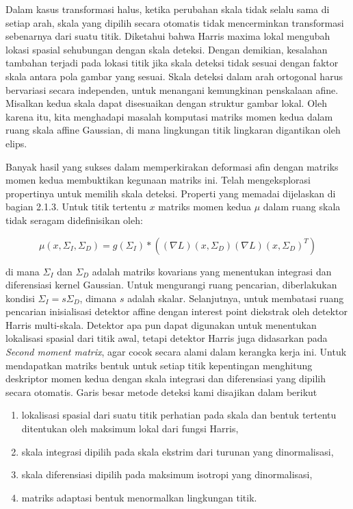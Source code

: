Dalam kasus transformasi halus, ketika perubahan skala tidak selalu sama di setiap arah, skala yang dipilih secara otomatis tidak mencerminkan transformasi sebenarnya dari suatu titik. Diketahui bahwa Harris maxima lokal mengubah lokasi spasial sehubungan dengan skala deteksi. Dengan demikian, kesalahan tambahan terjadi pada lokasi titik jika skala deteksi tidak sesuai dengan faktor skala antara pola gambar yang sesuai. Skala deteksi dalam arah ortogonal harus bervariasi secara independen, untuk menangani kemungkinan penskalaan afine. Misalkan kedua skala dapat disesuaikan dengan struktur gambar lokal. Oleh karena itu, kita menghadapi masalah komputasi matriks momen kedua dalam ruang skala affine Gaussian, di mana lingkungan titik lingkaran digantikan oleh elips.

Banyak hasil yang sukses dalam memperkirakan deformasi afin dengan matriks momen kedua membuktikan kegunaan matriks ini. Telah mengeksplorasi propertinya untuk memilih skala deteksi. Properti yang memadai dijelaskan di bagian 2.1.3. Untuk titik tertentu \(x\) matriks momen kedua \(\mu \) dalam ruang skala tidak seragam didefinisikan oleh:

\begin{equation*}
  \mu(x,\Sigma_{I},\Sigma_{D}) = g(\Sigma_{I}) * ((\nabla L)(x,\Sigma_{D})(\nabla L)(x,\Sigma_{D})^{T})
\end{equation*}

di mana \(\Sigma_{I}\) dan \(\Sigma_{D}\) adalah matriks kovarians yang menentukan integrasi dan diferensiasi kernel Gaussian. Untuk mengurangi ruang pencarian, diberlakukan kondisi \(\Sigma_{I}=s\Sigma_{D}\), dimana \(s\) adalah skalar. Selanjutnya, untuk membatasi ruang pencarian inisialisasi detektor affine dengan interest point diekstrak oleh detektor Harris multi-skala. Detektor apa pun dapat digunakan untuk menentukan lokalisasi spasial dari titik awal, tetapi detektor Harris juga didasarkan pada \emph{Second moment matrix}, agar cocok secara alami dalam kerangka kerja ini. Untuk mendapatkan matriks bentuk untuk setiap titik kepentingan menghitung deskriptor momen kedua dengan skala integrasi dan diferensiasi yang dipilih secara otomatis. Garis besar metode deteksi kami disajikan dalam berikut

\begin{enumerate}
  \setlength{\parskip}{0pt}
  \item lokalisasi spasial dari suatu titik perhatian pada skala dan bentuk tertentu ditentukan oleh maksimum lokal dari fungsi Harris,
  \item skala integrasi dipilih pada skala ekstrim dari turunan yang dinormalisasi,
  \item skala diferensiasi dipilih pada maksimum isotropi yang dinormalisasi,
  \item matriks adaptasi bentuk menormalkan lingkungan titik.
\end{enumerate}

